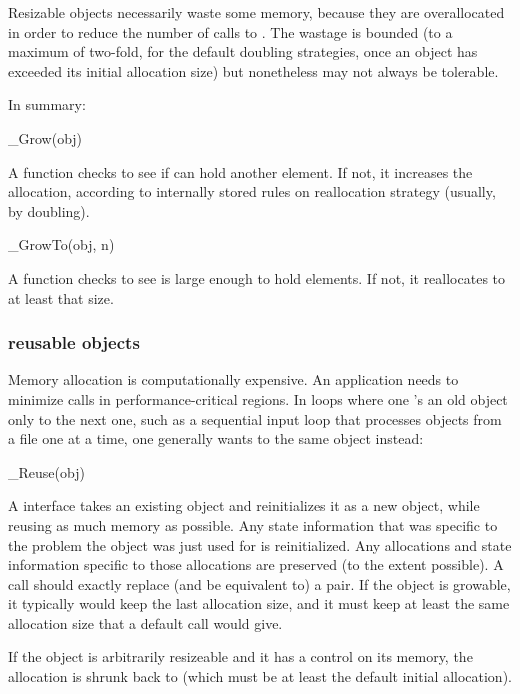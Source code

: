 Resizable objects necessarily waste some memory, because they are
overallocated in order to reduce the number of calls to
.  The wastage is bounded (to a maximum of two-fold,
for the default doubling strategies, once an object has exceeded its
initial allocation size) but nonetheless may not always be tolerable.

In summary: 

\begin{sreapi}
\hypertarget{ifc:Grow}
{\item[\_Grow(obj)]}

A  function checks to see if  can hold
another element. If not, it increases the allocation, according to
internally stored rules on reallocation strategy (usually, by
doubling). 
\end{sreapi}

\begin{sreapi}
\hypertarget{ifc:GrowTo}
{\item[\_GrowTo(obj, n)]}

A  function checks to see  is large
enough to hold  elements. If not, it reallocates to at least
that size.
\end{sreapi}

  \subsubsection{reusable objects}

Memory allocation is computationally expensive. An application needs
to minimize  calls in performance-critical
regions. In loops where one 's an old object only
to  the next one, such as a sequential input loop
that processes objects from a file one at a time, one generally wants
to  the same object instead:

\begin{sreapi}
\hypertarget{ifc:Reuse}
{\item[\_Reuse(obj)]}

A  interface takes an existing object and
reinitializes it as a new object, while reusing as much memory as
possible. Any state information that was specific to the problem the
object was just used for is reinitialized. Any allocations and state
information specific to those allocations are preserved (to the extent
possible).  A  call should exactly replace (and be
equivalent to) a  pair. If the object is
growable, it typically would keep the last allocation size, and it
must keep at least the same allocation size that a default
 call would give.

If the object is arbitrarily resizeable and it has a 
control on its memory, the allocation is shrunk back to
 (which must be at least the default initial
allocation).

\end{sreapi}

